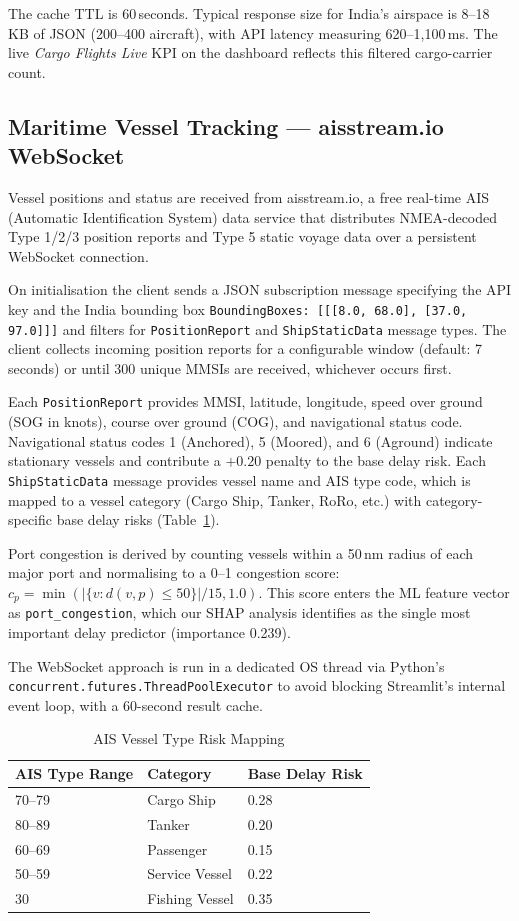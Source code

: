 \documentclass[conference]{IEEEtran}
\begin{document}
The cache TTL is 60\,seconds. Typical response size for India's
airspace is 8–18\,KB of JSON (200–400 aircraft), with API
latency measuring 620–1,100\,ms. The live \textit{Cargo Flights Live}
KPI on the dashboard reflects this filtered cargo-carrier count.

\subsection{Maritime Vessel Tracking — aisstream.io WebSocket}

Vessel positions and status are received from aisstream.io, a
free real-time AIS (Automatic Identification System) data
service that distributes NMEA-decoded Type 1/2/3 position
reports and Type 5 static voyage data over a persistent
WebSocket connection.

On initialisation the client sends a JSON subscription message
specifying the API key and the India bounding box
\texttt{BoundingBoxes: [[[8.0, 68.0], [37.0, 97.0]]]} and
filters for \texttt{PositionReport} and \texttt{ShipStaticData}
message types. The client collects incoming position reports for
a configurable window (default: 7 seconds) or until 300 unique
MMSIs are received, whichever occurs first.

Each \texttt{PositionReport} provides MMSI, latitude, longitude,
speed over ground (SOG in knots), course over ground (COG),
and navigational status code. Navigational status codes 1
(Anchored), 5 (Moored), and 6 (Aground) indicate stationary
vessels and contribute a $+0.20$ penalty to the base delay risk.
Each \texttt{ShipStaticData} message provides vessel name and
AIS type code, which is mapped to a vessel category (Cargo Ship,
Tanker, RoRo, etc.) with category-specific base delay risks
(Table~\ref{tab:vessel_risk}).

Port congestion is derived by counting vessels within a 50\,nm
radius of each major port and normalising to a 0–1 congestion
score: $c_p = \min(|\{v : d(v, p) \leq 50\}| / 15, 1.0)$. This
score enters the ML feature vector as \texttt{port\_congestion},
which our SHAP analysis identifies as the single most important
delay predictor (importance 0.239).

The WebSocket approach is run in a dedicated OS thread via
Python's \texttt{concurrent.futures.ThreadPoolExecutor} to avoid
blocking Streamlit's internal event loop, with a 60-second
result cache.

\begin{table}[h!]
\centering
\caption{AIS Vessel Type Risk Mapping}
\label{tab:vessel_risk}
\begin{tabular}{lll}
\toprule
\textbf{AIS Type Range} & \textbf{Category} & \textbf{Base Delay Risk} \\
\midrule
70–79 & Cargo Ship & 0.28 \\
80–89 & Tanker & 0.20 \\
60–69 & Passenger & 0.15 \\
50–59 & Service Vessel & 0.22 \\
30 & Fishing Vessel & 0.35 \\
\bottomrule
\end{tabular}
\end{table}
\end{document}

